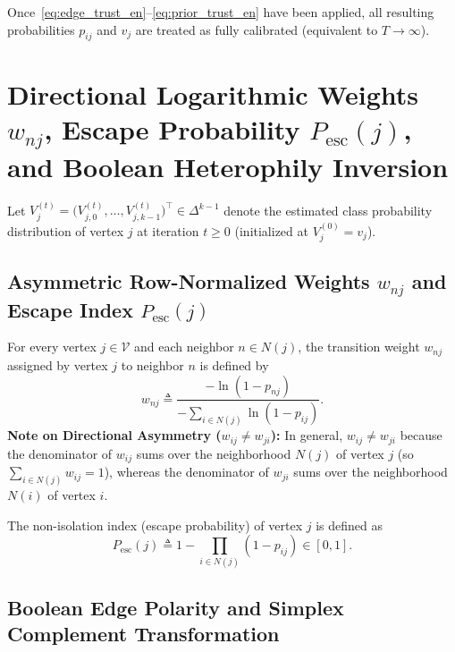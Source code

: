 \documentclass[11pt, a4paper]{article}
\theoremstyle{definition}
\theoremstyle{definition}
\begin{document}
Once~\eqref{eq:edge_trust_en}--\eqref{eq:prior_trust_en} have been applied, all resulting probabilities $p_{ij}$ and $v_j$ are treated as fully calibrated (equivalent to $T \to \infty$).

\section{Directional Logarithmic Weights \texorpdfstring{$w_{nj}$}{w\_nj}, Escape Probability \texorpdfstring{$P_{\mathrm{esc}}(j)$}{P\_esc(j)}, and Boolean Heterophily Inversion}

Let $V_j^{(t)} = \big(V_{j,0}^{(t)}, \dots, V_{j,k-1}^{(t)}\big)^\top \in \Delta^{k-1}$ denote the estimated class probability distribution of vertex $j$ at iteration $t \ge 0$ (initialized at $V_j^{(0)} = v_j$).

\subsection{Asymmetric Row-Normalized Weights \texorpdfstring{$w_{nj}$}{w\_nj} and Escape Index \texorpdfstring{$P_{\mathrm{esc}}(j)$}{P\_esc(j)}}

For every vertex $j \in \mathcal{V}$ and each neighbor $n \in N(j)$, the transition weight $w_{nj}$ assigned by vertex $j$ to neighbor $n$ is defined by
\begin{equation}\label{eq:w_nj_en}
w_{nj} \triangleq \frac{-\ln(1 - p_{nj})}{-\displaystyle\sum_{i \in N(j)} \ln(1 - p_{ij})}.
\end{equation}
\textbf{Note on Directional Asymmetry ($w_{ij} \ne w_{ji}$):} In general, $w_{ij} \ne w_{ji}$ because the denominator of $w_{ij}$ sums over the neighborhood $N(j)$ of vertex $j$ (so $\sum_{i \in N(j)} w_{ij} = 1$), whereas the denominator of $w_{ji}$ sums over the neighborhood $N(i)$ of vertex $i$.

The non-isolation index (escape probability) of vertex $j$ is defined as
\begin{equation}\label{eq:pesc_en}
P_{\mathrm{esc}}(j) \triangleq 1 - \prod_{i \in N(j)} (1 - p_{ij}) \in [0, 1].
\end{equation}

\subsection{Boolean Edge Polarity and Simplex Complement Transformation}
\end{document}

